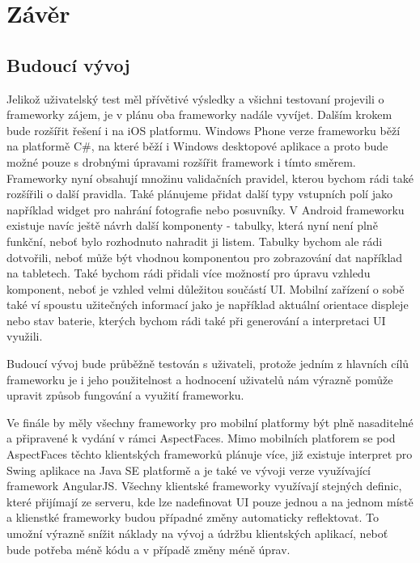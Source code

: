 \chapter{Závěr}
\section{Budoucí vývoj}
Jelikož uživatelský test měl přívětivé výsledky a všichni testovaní projevili o frameworky zájem, je v plánu oba frameworky nadále vyvíjet. Dalším krokem bude rozšířit řešení i na iOS platformu. Windows Phone verze frameworku běží na platformě C\#, na které běží i Windows desktopové aplikace a proto bude možné pouze s drobnými úpravami rozšířit framework i tímto směrem. Frameworky nyní obsahují množinu validačních pravidel, kterou bychom rádi také rozšířili o další pravidla. Také plánujeme přidat další typy vstupních polí jako například widget pro nahrání fotografie nebo posuvníky. V Android frameworku existuje navíc ještě návrh další komponenty - tabulky, která nyní není plně funkční, neboť bylo rozhodnuto nahradit ji listem. Tabulky bychom ale rádi dotvořili, neboť může být vhodnou komponentou pro zobrazování dat například na tabletech. Také bychom rádi přidali více možností pro úpravu vzhledu komponent, neboť je vzhled velmi důležitou součástí UI. Mobilní zařízení o sobě také ví spoustu užitečných informací jako je například aktuální orientace displeje nebo stav baterie, kterých bychom rádi také při generování a interpretaci UI využili.

Budoucí vývoj bude průběžně testován s uživateli, protože jedním z hlavních cílů frameworku je i jeho použitelnost a hodnocení uživatelů nám výrazně pomůže upravit způsob fungování a využití frameworku.

Ve finále by měly všechny frameworky pro mobilní platformy být plně nasaditelné a připravené k vydání v rámci AspectFaces. Mimo mobilních platforem se pod AspectFaces těchto klientských frameworků plánuje více, již existuje interpret pro Swing aplikace na Java SE platformě a je také ve vývoji verze využívající framework AngularJS. Všechny klientské frameworky využívají stejných definic, které přijímají ze serveru, kde lze nadefinovat UI pouze jednou a na jednom místě a klienstké frameworky budou případné změny automaticky reflektovat. To umožní výrazně snížit náklady na vývoj a údržbu klientských aplikací, neboť bude potřeba méně kódu a v případě změny méně úprav.

